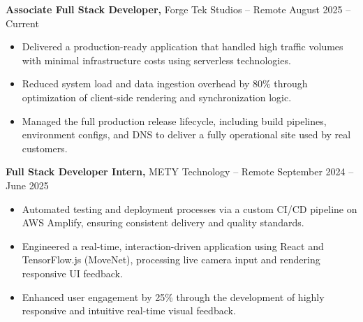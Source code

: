 \documentclass[11pt]{article}       %
\begin{document}
\textbf{Associate Full Stack Developer,} {Forge Tek Studios} -- Remote \hfill August 2025 -- Current 
\vspace{-9pt}
\begin{itemize}
  \item Delivered a production-ready application that handled high traffic volumes with minimal infrastructure costs using serverless technologies.
  \item Reduced system load and data ingestion overhead by 80\% through optimization of client-side rendering and synchronization logic.
  \item Managed the full production release lifecycle, including build pipelines, environment configs, and DNS to deliver a fully operational site used by real customers.
\end{itemize}

\textbf{Full Stack Developer Intern,} {METY Technology} -- Remote \hfill September 2024 -- June 2025 
\vspace{-9pt}
\begin{itemize}
  \item Automated testing and deployment processes via a custom CI/CD pipeline on AWS Amplify, ensuring consistent delivery and quality standards.
  \item Engineered a real-time, interaction-driven application using React and TensorFlow.js (MoveNet), processing live camera input and rendering responsive UI feedback.
  \item Enhanced user engagement by 25\% through the development of highly responsive and intuitive real-time visual feedback.
\end{itemize}

\end{document}
